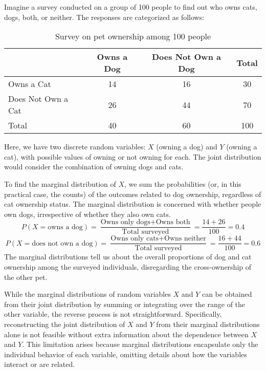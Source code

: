 \begin{example}
\label{ex:cat_and_dogs}
Imagine a survey conducted on a group of 100 people to find out who owns cats, dogs, both, or neither. The responses are categorized as follows:

\begin{table}[ht]
\centering
\begin{tabular}{|l|c|c|c|}
\hline
 & Owns a Dog & Does Not Own a Dog & Total \\ 
\hline
Owns a Cat & 14 & 16 & 30 \\ 
\hline
Does Not Own a Cat & 26 & 44 & 70 \\ 
\hline
Total & 40 & 60 & 100 \\ 
\hline
\end{tabular}
\caption{Survey on pet ownership among 100 people}
\label{table:pet_ownership}
\end{table}

Here, we have two discrete random variables: $X$ (owning a dog) and $Y$ (owning a cat), with possible values of owning or not owning for each. The joint distribution would consider the combination of owning dogs and cats.

To find the marginal distribution of $X$, we sum the probabilities (or, in this practical case, the counts) of the outcomes related to dog ownership, regardless of cat ownership status. The marginal distribution is concerned with whether people own dogs, irrespective of whether they also own cats.
\[
P(X=\text{owns a dog}) = \frac{\text{Owns only dogs} + \text{Owns both}}{\text{Total surveyed}} = \frac{14 + 26}{100} = 0.4
\]
\[
P(X=\text{does not own a dog}) = \frac{\text{Owns only cats} + \text{Owns neither}}{\text{Total surveyed}} = \frac{16 + 44}{100} = 0.6 
\]
The marginal distributions tell us about the overall proportions of dog and cat ownership among the surveyed individuals, disregarding the cross-ownership of the other pet.
\end{example}

While the marginal distributions of random variables $X$ and $Y$ can be obtained from their joint distribution by summing or integrating over the range of the other variable, the reverse process is not straightforward. Specifically, reconstructing the joint distribution of $X$ and $Y$ from their marginal distributions alone is not feasible without extra information about the dependence between $X$ and $Y$. This limitation arises because marginal distributions encapsulate only the individual behavior of each variable, omitting details about how the variables interact or are related.

